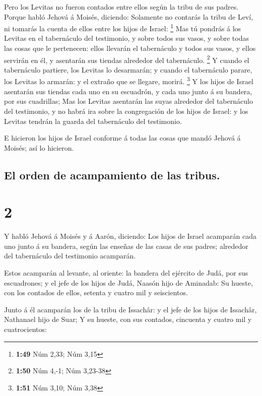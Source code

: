  Pero los Levitas no fueron contados entre ellos según la
tribu de sus padres.  Porque habló Jehová á Moisés,
diciendo:  Solamente no contarás la tribu de Leví, ni
tomarás la cuenta de ellos entre los hijos de Israel: \footnote{\textbf{1:49}
  Núm 2,33; Núm 3,15}  Mas tú pondrás á los Levitas en el
tabernáculo del testimonio, y sobre todos sus vasos, y sobre todas las
cosas que le pertenecen: ellos llevarán el tabernáculo y todos sus
vasos, y ellos servirán en él, y asentarán sus tiendas alrededor del
tabernáculo. \footnote{\textbf{1:50} Núm 4,-1; Núm 3,23-38}
 Y cuando el tabernáculo partiere, los Levitas lo
desarmarán; y cuando el tabernáculo parare, los Levitas lo armarán: y el
extraño que se llegare, morirá. \footnote{\textbf{1:51} Núm 3,10; Núm
  3,38}  Y los hijos de Israel asentarán sus tiendas cada
uno en su escuadrón, y cada uno junto á su bandera, por sus cuadrillas;
 Mas los Levitas asentarán las suyas alrededor del
tabernáculo del testimonio, y no habrá ira sobre la congregación de los
hijos de Israel: y los Levitas tendrán la guarda del tabernáculo del
testimonio.

 E hicieron los hijos de Israel conforme á todas las
cosas que mandó Jehová á Moisés; así lo hicieron.

\hypertarget{el-orden-de-acampamiento-de-las-tribus.}{%
\subsection{El orden de acampamiento de las
tribus.}\label{el-orden-de-acampamiento-de-las-tribus.}}

\hypertarget{section-1}{%
\section{2}\label{section-1}}

 Y habló Jehová á Moisés y á Aarón, diciendo:
 Los hijos de Israel acamparán cada uno junto á su
bandera, según las enseñas de las casas de sus padres; alrededor del
tabernáculo del testimonio acamparán.

 Estos acamparán al levante, al oriente: la bandera del
ejército de Judá, por sus escuadrones; y el jefe de los hijos de Judá,
Naasón hijo de Aminadab:  Su hueste, con los contados de
ellos, setenta y cuatro mil y seiscientos.

 Junto á él acamparán los de la tribu de Issachâr: y el
jefe de los hijos de Issachâr, Nathanael hijo de Suar;  Y
su hueste, con sus contados, cincuenta y cuatro mil y cuatrocientos:

